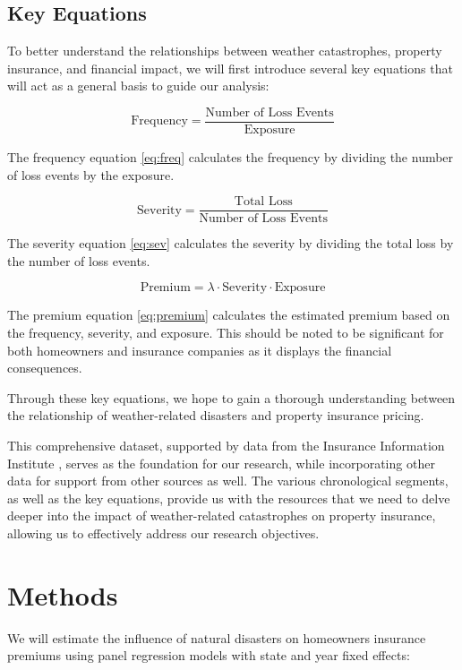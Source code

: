 \documentclass[12pt]{article}
\begin{document}
\subsection{Key Equations}

To better understand the relationships between weather catastrophes, property insurance, and financial impact, we will first introduce 
several key equations that will act as a general basis to guide our analysis:

\begin{equation}
    \label{eq:freq}
    \text{Frequency} = \frac{\text{Number of Loss Events}}{\text{Exposure}}
\end{equation}

The frequency equation \ref{eq:freq} calculates the frequency by dividing the number of loss events by the exposure.

\begin{equation}
    \label{eq:sev}
    \text{Severity} = \frac{\text{Total Loss}}{\text{Number of Loss Events}}
\end{equation}

The severity equation \ref{eq:sev} calculates the severity by dividing the total loss by the number of loss events.


\begin{equation}
    \label{eq:premium}
    \text{Premium} = \lambda \cdot \text{Severity} \cdot \text{Exposure}
\end{equation}

The premium equation \ref{eq:premium} calculates the estimated premium based on the frequency, severity, and exposure. This should be noted
to be significant for both homeowners and insurance companies as it displays the financial consequences.

Through these key equations, we hope to gain a thorough understanding between the relationship of weather-related disasters 
and property insurance pricing. 

This comprehensive dataset, supported by data from the Insurance Information Institute \cite{iii}, serves as the foundation 
for our research, while incorporating other data for support from other sources as well. The various chronological segments, as well 
as the key equations, provide us with the resources that we need to delve deeper into the impact of weather-related catastrophes on 
property insurance, allowing us to effectively address our research objectives. 



\section{Methods}
\label{sec:meth}
We will estimate the influence of natural disasters on homeowners insurance premiums using panel regression models with state and year 
fixed effects:
\end{document}
